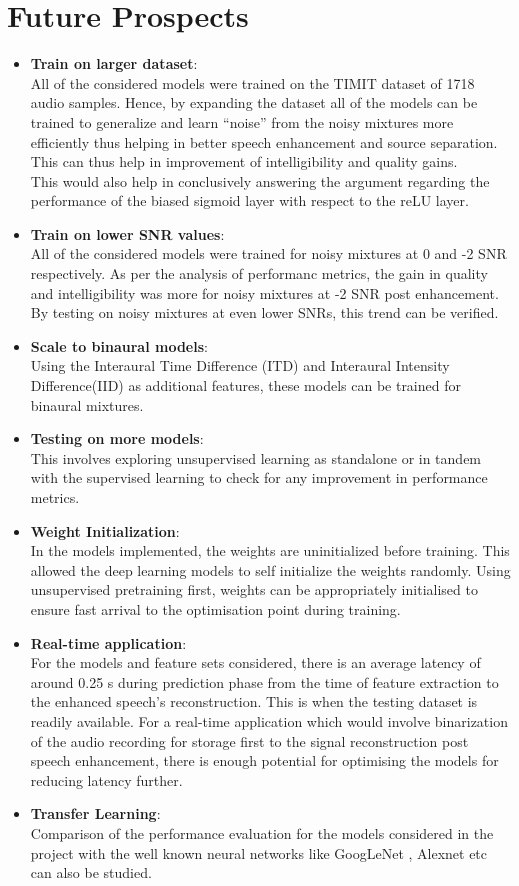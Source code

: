 \section{\textbf{Future Prospects}}
\begin{itemize}
\item \textbf{Train on larger dataset}:\\
All of the considered models were trained on the TIMIT dataset of 1718 audio samples. Hence, by expanding the dataset all of the models can be trained to generalize and learn \enquote{noise} from the noisy mixtures more efficiently thus helping in better speech enhancement and source separation. This can thus help in improvement of intelligibility and quality gains.\\ This would also help in conclusively answering the argument regarding the performance of the biased sigmoid layer with respect to the reLU layer.
\item \textbf{Train on lower SNR values}:\\
All of the considered models were trained for noisy mixtures at 0 and -2 SNR respectively. As per the analysis of performanc metrics, the gain in quality and intelligibility was more for noisy mixtures at -2 SNR post enhancement. By testing on noisy mixtures at even lower SNRs, this trend can be verified.
\item \textbf{Scale to binaural models}:\\ Using the Interaural Time Difference (ITD) and Interaural Intensity Difference(IID) as additional features, these models can be trained for binaural mixtures.
\item \textbf{Testing on more models}:\\ This involves exploring unsupervised learning as standalone or in tandem with the supervised learning  to check for any improvement in performance metrics.
\item \textbf{Weight Initialization}:\\ In the models implemented, the weights are uninitialized before training. This allowed the deep learning models to self initialize the weights randomly. Using unsupervised pretraining first, weights can be appropriately initialised to ensure fast arrival to the optimisation point during training.
\item \textbf{Real-time application}:\\ For the models and feature sets considered, there is an average latency of around 0.25 s during prediction phase from the time of feature extraction to the enhanced speech's reconstruction. This is when the testing dataset is readily available. For a real-time application which would involve binarization of the audio recording for storage first to the signal reconstruction post speech enhancement, there is enough potential for optimising the models for reducing latency further.
\item \textbf{Transfer Learning}:\\ Comparison of the performance evaluation for the models considered in the project with the well known neural networks like GoogLeNet , Alexnet etc can also be studied.
\end{itemize}